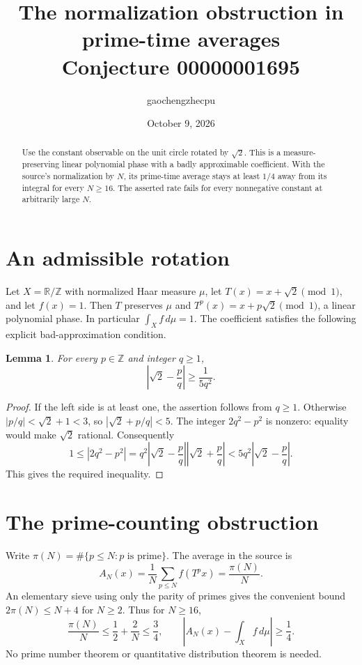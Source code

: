 \documentclass[11pt]{article}
\title{The normalization obstruction in prime-time averages\\Conjecture 00000001695}
\author{gaochengzhecpu}
\date{October 9, 2026}
\newtheorem{lemma}{Lemma}
\begin{document}
\maketitle
\begin{abstract}
Use the constant observable on the unit circle rotated by $\sqrt2$.
This is a measure-preserving linear polynomial phase with a badly
approximable coefficient. With the source's normalization by $N$, its
prime-time average stays at least $1/4$ away from its integral for every
$N\geq16$. The asserted rate fails for every nonnegative constant at
arbitrarily large $N$.
\end{abstract}

\section{An admissible rotation}
Let $X=\mathbb R/\mathbb Z$ with normalized Haar measure $\mu$, let
$T(x)=x+\sqrt2\pmod1$, and let $f(x)=1$. Then $T$ preserves $\mu$ and
$T^p(x)=x+p\sqrt2\pmod1$, a linear polynomial phase. In particular
$\int_X f\,d\mu=1$. The coefficient satisfies the following explicit
bad-approximation condition.

\begin{lemma}
For every $p\in\mathbb Z$ and integer $q\geq1$,
\[
 \left|\sqrt2-\frac pq\right|\geq\frac{1}{5q^2}.
\]
\end{lemma}
\begin{proof}
If the left side is at least one, the assertion follows from $q\geq1$.
Otherwise $|p/q|<\sqrt2+1<3$, so $|\sqrt2+p/q|<5$.
The integer $2q^2-p^2$ is nonzero: equality would make $\sqrt2$ rational.
Consequently
\[
 1\leq|2q^2-p^2|
 =q^2\left|\sqrt2-\frac pq\right|
       \left|\sqrt2+\frac pq\right|
 <5q^2\left|\sqrt2-\frac pq\right|.
\]
This gives the required inequality.
\end{proof}

\section{The prime-counting obstruction}
Write $\pi(N)=\#\{p\leq N:p\text{ is prime}\}$. The average in the source is
\[
 A_N(x)=\frac1N\sum_{p\leq N}f(T^p x)=\frac{\pi(N)}{N}.
\]
An elementary sieve using only the parity of primes gives the convenient
bound $2\pi(N)\leq N+4$ for $N\geq2$. Thus for $N\geq16$,
\[
 \frac{\pi(N)}N\leq\frac12+\frac2N\leq\frac34,
 \qquad
 \left|A_N(x)-\int_X f\,d\mu\right|\geq\frac14.
\]
No prime number theorem or quantitative distribution theorem is needed.
\end{document}
